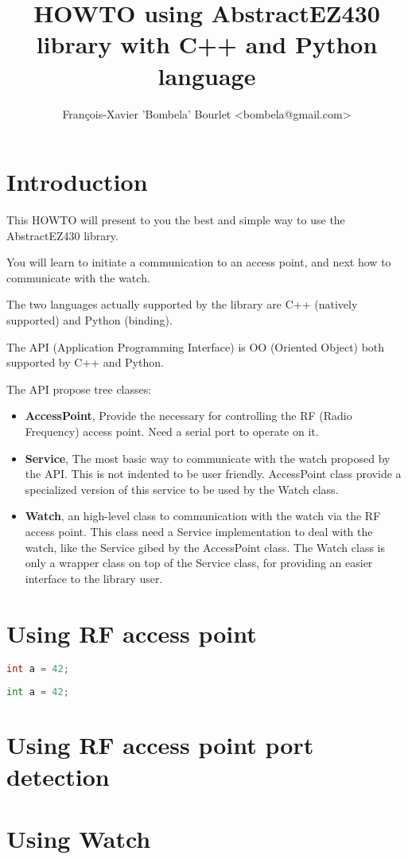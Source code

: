 \documentclass[11pt,a4paper]{article}
\title{HOWTO using AbstractEZ430 library with C++ and Python language}
\author{François-Xavier 'Bombela' Bourlet <bombela@gmail.com>}
\begin{document}
\lstset{
	language=C++
}

\maketitle
\newpage

\tableofcontents
\newpage

\section{Introduction}

This HOWTO will present to you the best and simple way
to use the AbstractEZ430 library.

You will learn to initiate a communication to an access point,
and next how to communicate with the watch.

The two languages actually supported by the library
are C++ (natively supported) and Python (binding).

The API (Application Programming Interface) is OO (Oriented Object)
both supported by C++ and Python.

The API propose tree classes:
\begin{itemize}
	\item \textbf{AccessPoint},
			Provide the necessary for controlling the RF (Radio Frequency) access point.
			Need a serial port to operate on it.
	\item \textbf{Service},
			The most basic way to communicate with the watch proposed
			by the API. This is not indented to be user friendly.
			AccessPoint class provide a specialized version of this service
			to be used by the Watch class.
	\item \textbf{Watch},
			an high-level class to communication with the watch via the RF access point.
			This class need a Service implementation to deal with the watch,
			like the Service gibed by the AccessPoint class.
			The Watch class is only a wrapper class on top of the Service class,
			for providing an easier interface to the library user.
\end{itemize}

\section{Using RF access point}



\begin{lstlisting}[language=C++]
	int a = 42;
\end{lstlisting}

\begin{lstlisting}[language=python]
	int a = 42;
\end{lstlisting}

\section{Using RF access point port detection}

\section{Using Watch}
\end{document}
